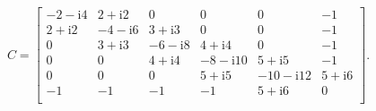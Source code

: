 \documentclass[../libro.tex]{subfiles}
\begin{document}
\begin{example}
\begin{align*}
        C =
        \begin{bmatrix}
            -2-\mathrm{i}4 & 2+\mathrm{i}2  & 0              & 0               & 0                & -1            \\
            2+\mathrm{i}2  & -4-\mathrm{i}6 & 3+\mathrm{i}3  & 0               & 0                & -1            \\
            0              & 3+\mathrm{i}3  & -6-\mathrm{i}8 & 4+\mathrm{i}4   & 0                & -1            \\
            0              & 0              & 4+\mathrm{i}4  & -8-\mathrm{i}10 & 5+\mathrm{i}5    & -1            \\
            0              & 0              & 0              & 5+\mathrm{i}5   & -10-\mathrm{i}12 & 5+\mathrm{i}6 \\
            -1             & -1             & -1             & -1              & 5+\mathrm{i}6    & 0             \\
        \end{bmatrix}.
    \end{align*}


\end{example}
\end{document}
